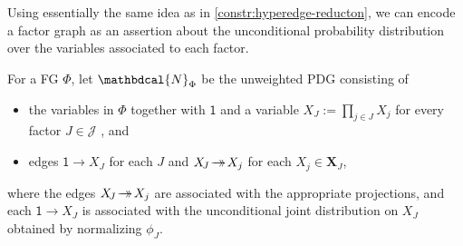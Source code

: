 \documentclass[letterpaper]{article} %
\theoremstyle{plain}
\theoremstyle{definition}
\theoremstyle{remark}
\newcommand\mat[1]{\mathbf{#1}}
\newcommand{\tto}{\rightarrow\mathrel{\mspace{-15mu}}\rightarrow}
\newcommand{\bp}[1][L]{\mat{p}_{\!_{#1}\!}}
\newcommand{\dg}[1]{\mathbdcal{#1}}
\newcommand{\var}[1]{\mathsf{#1}}
\newcommand{\PDGof}[1]{{\dg M}_{#1}}
\newcommand{\UPDGof}[1]{{\dg N}_{#1}}
\begin{document}
Using essentially the same idea as in \cref{constr:hyperedge-reducton},
we can encode a factor graph as an assertion about the unconditional
probability distribution over the variables associated to each
factor.  

\begin{defn} \label{def:fg2PDG}
For a FG $\Phi$, let $\UPDGof{\Phi}$ be
the unweighted PDG consisting of
\begin{itemize}
	\item the variables in $\Phi$ together
   with $\var 1$ and a variable $X_{\!J} := \prod_{j \in J} X_j$ for every factor $J \in \mathcal J$%
   , and
   \item edges ${\var 1} \!\to\! X_{\!J}$ for each $J$ and $X_{\!J} \!\tto\! X_j$ for each $X_j \in \mat X_J$,
\end{itemize}
where the edges $ X_{\!J} \!\tto\! X_j$ are associated with the appropriate projections, and each ${\var 1} \!\to\! X_{\!J}$ is associated with the unconditional joint distribution on $X_J$ obtained by normalizing $\phi_J$.

\end{defn}
\end{document}

